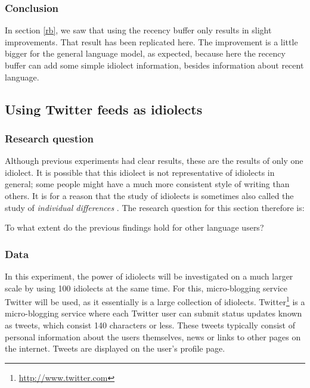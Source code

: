 \documentclass[12pt]{article}
\begin{document}
\subsubsection{Conclusion}
In section \ref{rb}, we saw that using the recency buffer only results in slight improvements. That result has been replicated here. The improvement is a little bigger for the general language model, as expected, because here the recency buffer can add some simple idiolect information, besides information about recent language.

\subsection{Using Twitter feeds as idiolects} \label{twitter_idiolects}

\subsubsection{Research question}
Although previous experiments had clear results, these are the results of only one idiolect. It is possible that this idiolect is not representative of idiolects in general; some people might have a much more consistent style of writing than others. It is for a reason that the study of idiolects is sometimes also called the study of \emph{individual differences} \cite{barlow10}. The research question for this section therefore is:

\begin{examples}
\item To what extent do the previous findings hold for other language users?
\end{examples}

\subsubsection{Data} \label{data_twitter_idiolects}
In this experiment, the power of idiolects will be investigated on a much larger scale by using 100 idiolects at the same time. For this, micro-blogging service Twitter will be used, as it essentially is a large collection of idiolects. Twitter\footnote{\url{http://www.twitter.com}} is a micro-blogging service where each Twitter user can submit status updates known as tweets, which consist 140 characters or less. These tweets typically consist of personal information about the users themselves, news or links to other pages on the internet. Tweets are displayed on the user's profile page. 
\end{document}
